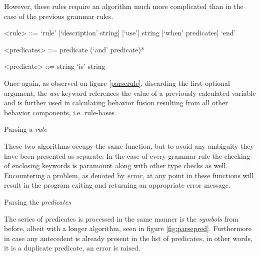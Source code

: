 However, these rules require an algorithm much more complicated than in the case of the previous grammar rules.
\begin{grammar}
<rule> ::= `rule' [`description' string] [`use'] string [`when' predicates] `end'

<predicates> ::= predicate (`and' predicate)*

<predicate> ::= string `is' string
\end{grammar}

Once again, as observed on figure \ref{parserule}, discarding the first optional argument, the \textit{use} keyword references the value of a previously calculated variable and is further used  in calculating behavior fusion resulting from all other behavior components, i.e. rule-bases.

\vskip 0.6cm
\begin{algorithm}[H]
\caption{Parsing a \textit{rule}}
\label{fig:parserule}
\end{algorithm}
\vskip 0.6cm

These two algorithms occupy the same function, but to avoid any ambiguity they have been presented as separate. In the case of every grammar rule the checking of enclosing keywords is paramount along with other type checks as well. Encountering a problem, as denoted by \textit{error},  at any point in these functions will result in the program exiting and returning an appropriate error message.

\vskip 0.6cm
\begin{algorithm}[H]
\caption{Parsing the \textit{predicates}}
\label{fig:parsepred}
\end{algorithm}
\vskip 0.6cm

The series of predicates is processed in the same manner is the \textit{symbols} from before, albeit with a longer algorithm, seen in figure \ref{fig:parsepred}. Furthermore in case any antecedent is already present in the list of predicates, in other words, it is a duplicate predicate, an error is raised.

